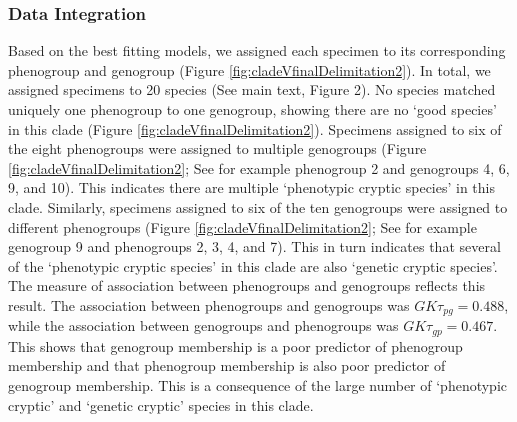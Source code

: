 \documentclass[
  11pt,
]{article}
\begin{document}
\hypertarget{data-integration-5}{%
\subsubsection{Data Integration}\label{data-integration-5}}

Based on the best fitting models, we assigned each specimen to its corresponding phenogroup and genogroup (Figure \ref{fig:cladeVfinalDelimitation2}). In total, we assigned specimens to 20 species (See main text, Figure 2). No species matched uniquely one phenogroup to one genogroup, showing there are no `good species' in this clade (Figure \ref{fig:cladeVfinalDelimitation2}). Specimens assigned to six of the eight phenogroups were assigned to multiple genogroups (Figure \ref{fig:cladeVfinalDelimitation2}; See for example phenogroup 2 and genogroups 4, 6, 9, and 10). This indicates there are multiple `phenotypic cryptic species' in this clade. Similarly, specimens assigned to six of the ten genogroups were assigned to different phenogroups (Figure \ref{fig:cladeVfinalDelimitation2}; See for example genogroup 9 and phenogroups 2, 3, 4, and 7). This in turn indicates that several of the `phenotypic cryptic species' in this clade are also `genetic cryptic species'. The measure of association between phenogroups and genogroups reflects this result. The association between phenogroups and genogroups was \(GK\tau_{pg}=0.488\), while the association between genogroups and phenogroups was \(GK\tau_{gp}=0.467\). This shows that genogroup membership is a poor predictor of phenogroup membership and that phenogroup membership is also poor predictor of genogroup membership. This is a consequence of the large number of `phenotypic cryptic' and `genetic cryptic' species in this clade.
\end{document}
